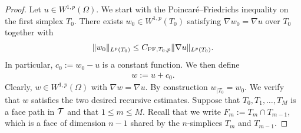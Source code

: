 \documentclass[10pt,a4paper]{article}
\begin{document}
\begin{proof}
    Let $u \in W^{1,p}(\Omega)$. 
    We start with the Poincar\'e--Friedrichs inequality on the first simplex $T_{0}$. 
    There exists $w_0 \in W^{1,p}(T_{0})$ satisfying $\nabla w_0 = \nabla u$ over $T_{0}$ together with 
    \begin{gather*}
        \| w_0 \|_{L^{p}(T_{0})} \leq C_{{{\rm PF}},T_{0},p} \| \nabla u \|_{L^{p}(T_{0})}.
    \end{gather*}
    In particular, $c_{0} := w_0 - u$ is a constant function. 
    We then define 
    \begin{align*}
        w := u + c_0
        .
    \end{align*} 
    Clearly, $w \in W^{1,p}(\Omega)$ with $\nabla w = \nabla u$.
    By construction $w_{|T_{0}} = w_0$. 
    We verify that $w$ satisfies the two desired recursive estimates.
    Suppose that $T_0, T_1, \dots, T_M$ is a face path in ${\mathcal T}$
    and that $1 \leq m \leq M$.
    Recall that we write $F_m := T_m \cap T_{m-1}$, which is a face of dimension $n-1$ shared by the $n$-simplices $T_{m}$ and $T_{m-1}$. 
    

\end{proof}
\end{document}
